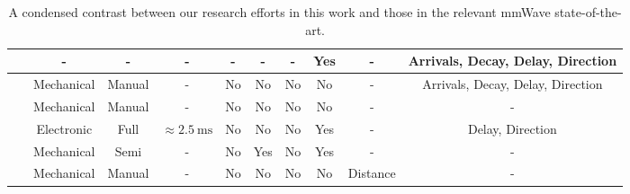 \documentclass[10pt, twocolumn]{IEEEtran}
\begin{document}
\begin{table}
\begin{tabular}{|*{10}{c|}}
    \hline
   ~\cite{Indoor60G} & - & - & - & - & - & - & Yes & - & Arrivals, Decay, Delay, Direction\\
    \hline
   ~\cite{QDC_NIST} & Mechanical & Manual & - & No & No & No & No & - & Arrivals, Decay, Delay, Direction\\
    \hline
   ~\cite{D2DHumanBlockage} & Mechanical & Manual & - & No & No & No & No & - & -\\
    \hline
   ~\cite{DopplerHST} & Electronic & Full & ${\approx}\SI{2.5}{\milli\second}$ & No & No & No & Yes & - & Delay, Direction\\
    \hline
   ~\cite{V2XBlockages} & Mechanical & Semi & - & No & Yes & No & Yes & - & -\\
    \hline
   ~\cite{MacCartneyUrbanHumanBlockage} & Mechanical & Manual & - & No & No & No & No & Distance & -\\
    \hline
    \end{tabular}
    \vspace{-1mm}
    \caption{A condensed contrast between our research efforts in this work and those in the relevant mmWave state-of-the-art.}
    \label{T2}
\end{table}
\end{document}

